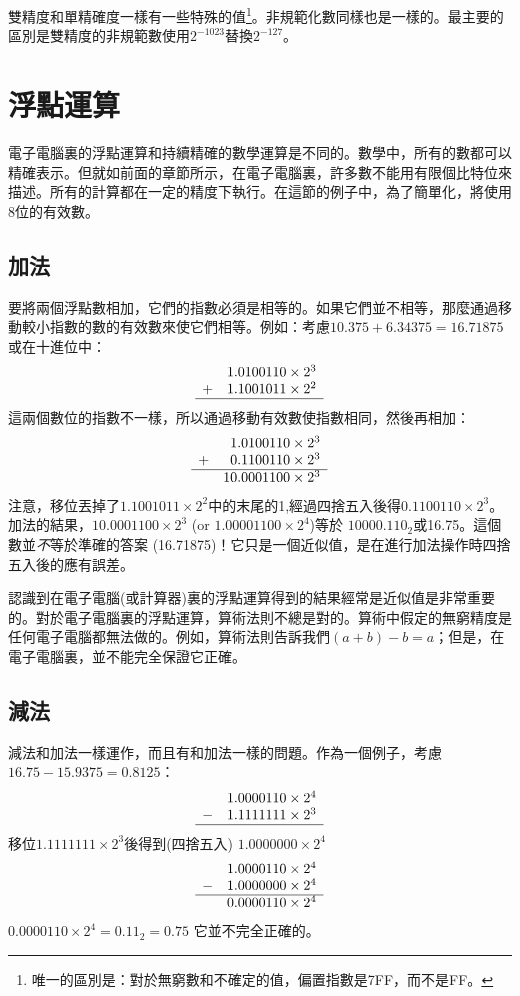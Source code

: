 {雙精度和單精確度一樣有一些特殊的值\footnote{唯一的區別是：對於無窮數和不確定的值，偏置指數是7FF，而不是FF。}。非規範化數同樣也是一樣的。最主要的區別是雙精度的非規範數使用$2^{-1023}$替換$2^{-127}$。

\section{浮點運算}

電子電腦裏的浮點運算和持續精確的數學運算是不同的。數學中，所有的數都可以精確表示。但就如前面的章節所示，在電子電腦裏，許多數不能用有限個比特位來描述。所有的計算都在一定的精度下執行。在這節的例子中，為了簡單化，將使用8位的有效數。

\subsection{加法}
要將兩個浮點數相加，它們的指數必須是相等的。如果它們並不相等，那麼通過移動較小指數的數的有效數來使它們相等。例如：考慮$10.375 + 6.34375 = 16.71875$或在十進位中：
\[
\begin{array}{rr}
 & 1.0100110 \times 2^3 \\
+& 1.1001011 \times 2^2 \\ \hline
\end{array}
\]
這兩個數位的指數不一樣，所以通過移動有效數使指數相同，然後再相加：
\[
\begin{array}{rr@{.}l}
 &  1&0100110 \times 2^3 \\
+&  0&1100110 \times 2^3 \\ \hline
 & 10&0001100 \times 2^3
\end{array}
\]
注意，移位丟掉了$1.1001011 \times 2^2$中的末尾的1,經過四捨五入後得$0.1100110 \times 2^3$。加法的結果，$10.0001100 \times 2^3$ (or $1.00001100 \times 2^4$)等於
$10000.110_2$或16.75。這個數並\emph{不}等於準確的答案
(16.71875)！它只是一個近似值，是在進行加法操作時四捨五入後的應有誤差。

認識到在電子電腦(或計算器)裏的浮點運算得到的結果經常是近似值是非常重要的。對於電子電腦裏的浮點運算，算術法則不總是對的。算術中假定的無窮精度是任何電子電腦都無法做的。例如，算術法則告訴我們$(a + b) - b = a$；但是，在電子電腦裏，並不能完全保證它正確。

\subsection{減法}
減法和加法一樣運作，而且有和加法一樣的問題。作為一個例子，考慮$16.75 - 15.9375 = 0.8125$：
\[
\begin{array}{rr}
 & 1.0000110 \times 2^4 \\
-& 1.1111111 \times 2^3 \\ \hline
\end{array}
\]
移位$1.1111111 \times 2^3$後得到(四捨五入) $1.0000000 \times 2^4$
\[
\begin{array}{rr}
 & 1.0000110 \times 2^4 \\
-& 1.0000000 \times 2^4 \\ \hline
 & 0.0000110 \times 2^4
\end{array}
\]
$0.0000110 \times 2^4 = 0.11_2 = 0.75$ 它並不完全正確的。

}
